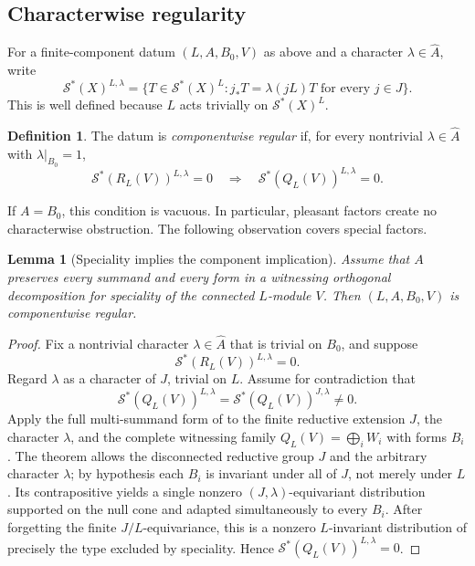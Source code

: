 \documentclass[11pt,reqno]{amsart}
\numberwithin{equation}{section}
\newtheorem{lemma}[theorem]{Lemma}
\theoremstyle{definition}
\newtheorem{definition}[theorem]{Definition}
\theoremstyle{remark}
\newcommand{\cS}{\mathcal S}
\begin{document}
\subsection{Characterwise regularity}

For a finite-component datum $(L,A,B_0,V)$ as above and a character
$\lambda\in\widehat A$, write
\[
 \cS^*(X)^{L,\lambda}
 =\{T\in\cS^*(X)^L:j_*T=\lambda(jL)T\text{ for every }j\in J\}.
\]
This is well defined because $L$ acts trivially on $\cS^*(X)^L$.

\begin{definition}\label{def:componentwise-regular}
The datum is \emph{componentwise regular} if, for every nontrivial
$\lambda\in\widehat A$ with $\lambda|_{B_0}=1$,
\begin{equation}\label{eq:component-implication}
 \cS^*(R_L(V))^{L,\lambda}=0
 \quad\Longrightarrow\quad
 \cS^*(Q_L(V))^{L,\lambda}=0.
\end{equation}
\end{definition}

If $A=B_0$, this condition is vacuous.  In particular, pleasant factors create
no characterwise obstruction.  The following observation covers special
factors.

\begin{lemma}[Speciality implies the component implication]
\label{lem:special-component}
Assume that $A$ preserves every summand and every form in a witnessing
orthogonal decomposition for speciality of the connected $L$-module $V$.  Then
$(L,A,B_0,V)$ is componentwise regular.
\end{lemma}

\begin{proof}
Fix a nontrivial character $\lambda\in\widehat A$ that is trivial on $B_0$,
and suppose
\[
 \cS^*(R_L(V))^{L,\lambda}=0.
\]
Regard $\lambda$ as a character of $J$, trivial on $L$.  Assume for
contradiction that
\[
 \cS^*(Q_L(V))^{L,\lambda}
 =\cS^*(Q_L(V))^{J,\lambda}\ne0.
\]
Apply the full multi-summand form of
\cite[Theorem~5.2.2]{AG09} to the finite reductive extension $J$, the
character $\lambda$, and the complete witnessing family
$Q_L(V)=\bigoplus_iW_i$ with forms $B_i$.  The theorem allows the disconnected
reductive group $J$ and the arbitrary character $\lambda$; by hypothesis each
$B_i$ is invariant under all of $J$, not merely under $L$.  Its contrapositive
yields a single
nonzero $(J,\lambda)$-equivariant distribution supported on the null cone and
adapted simultaneously to every $B_i$.  After forgetting the finite
$J/L$-equivariance, this is a nonzero $L$-invariant distribution of precisely
the type excluded by speciality.  Hence
$\cS^*(Q_L(V))^{L,\lambda}=0$.
\end{proof}
\end{document}
